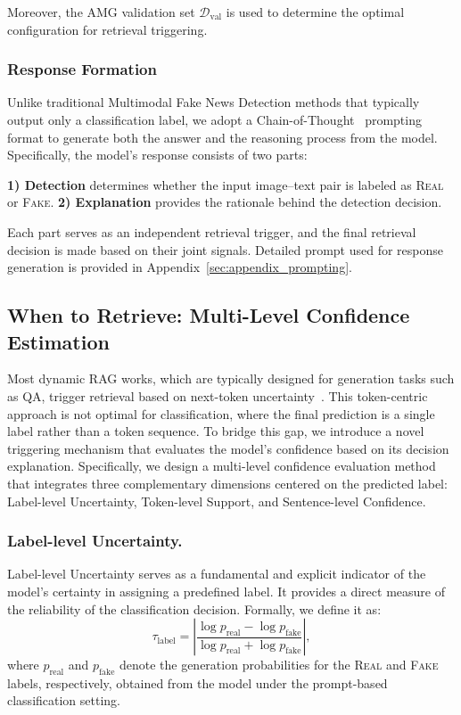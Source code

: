 Moreover, the AMG validation set $\mathcal{D}_{\text{val}}$ is used to determine the optimal configuration for retrieval triggering.


\subsubsection{Response Formation}
Unlike traditional Multimodal Fake News Detection methods that typically output only a classification label, we adopt a Chain-of-Thought~\cite{wei2022chain} prompting format to generate both the answer and the reasoning process from the model. Specifically, the model's response consists of two parts:

\textbf{1) Detection}
determines whether the input image--text pair is labeled as \textsc{Real} or \textsc{Fake}.
\textbf{2) Explanation}
provides the rationale behind the detection decision.

Each part serves as an independent retrieval trigger, and the final retrieval decision is made based on their joint signals.
Detailed prompt used for response generation is provided in Appendix~\ref{sec:appendix_prompting}. 
\subsection{When to Retrieve: Multi-Level Confidence Estimation}
\label{sec:when}
Most dynamic RAG works, which are typically designed for generation tasks such as QA, trigger retrieval based on next-token uncertainty~\cite{su2024dragin,jiang2023active}.
This token-centric approach is not optimal for classification, where the final prediction is a single label rather than a token sequence.
To bridge this gap, we introduce a novel triggering mechanism that evaluates the model's confidence based on its decision explanation. Specifically, we design a multi-level confidence evaluation method that integrates three complementary dimensions centered on the predicted label: Label-level Uncertainty, Token-level Support, and Sentence-level Confidence.

\subsubsection{Label-level Uncertainty.}
Label-level Uncertainty serves as a fundamental and explicit indicator of the model’s certainty in assigning a predefined label. It provides a direct measure of the reliability of the classification decision. Formally, we define it as:
\begin{equation}
     \tau_{\text{label}} = \left| \frac{\log p_{\text{real}} - \log p_{\text{fake}}}{\log p_{\text{real}} + \log p_{\text{fake}}} \right| ,
\end{equation}
where $p_{\text{real}}$ and $p_{\text{fake}}$ denote the generation probabilities for the \textsc{Real} and \textsc{Fake} labels, respectively, obtained from the model under the prompt-based classification setting.

